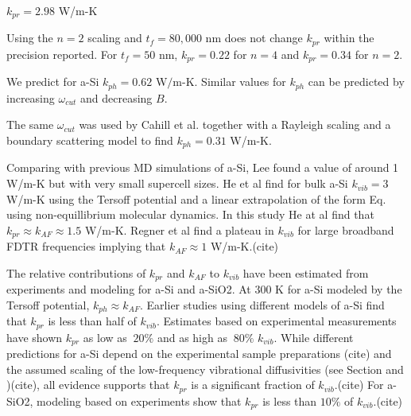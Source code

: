 \documentclass[aps,prb,twocolumn,superscriptaddress,footinbib,amsmath,amssymb,floatfix]{revtex4}
\begin{document}
$k_{pr} = 2.98$ W/m-K

Using the $n=2$ scaling and $t_f = 80,000$ nm does not change 
$k_{pr}$ within the precision reported. For $t_f = 50$ nm, 
$k_{pr} = 0.22$ for $n=4$ and $k_{pr} = 0.34$ for $n=2$. 






We predict for a-Si $k_{ph} = 0.62$ 
W$/$m-K. Similar values for $k_{ph}$ can be predicted by increasing 
$\omega_{cut}$ and decreasing $B$. 

The same $\omega_{cut}$ was used by Cahill et al. 
together with a Rayleigh scaling and a boundary scattering model to 
find $k_{ph} = 0.31$ W/m-K.\cite{cahill_thermal_1994} 

Comparing with previous MD simulations of a-Si, 
Lee found a value of around 1 W/m-K 
but with very small supercell sizes.\cite{lee_molecular-dynamics_1991}
He et al find for bulk a-Si $k_{vib} = 3$ W/m-K using the Tersoff 
potential and a linear extrapolation of the form Eq. using 
non-equillibrium molecular dynamics. In this study He at al find 
that $k_{pr} \approx k_{AF} \approx 1.5$ W/m-K.  Regner et al find 
a plateau in $k_{vib}$ for large broadband FDTR frequencies 
implying that $k_{AF} \approx 1$ W/m-K.(cite) 

The relative contributions of $k_{pr}$ and $k_{AF}$ to $k_{vib}$ have 
been estimated from experiments and modeling for 
a-Si and a-SiO2. At 300 K for a-Si modeled by the Tersoff potential,   
$k_{ph} \approx k_{AF}$.\cite{he_heat_2011} Earlier studies using 
different models of a-Si find 
that $k_{pr}$ is less than half of 
$k_{vib}$.\cite{feldman_thermal_1993,
feldman_numerical_1999} Estimates based on experimental measurements 
have shown $k_{pr}$ as low as 
$~20\%$\cite{cahill_thermal_1994,feldman_numerical_1999} 
and as high as $~80\%$ $k_{vib}$.
\cite{liu_high_2009,yang_anomalously_2010}
While different predictions for a-Si 
depend on the experimental sample preparations
(cite) 
and the assumed scaling of the low-frequency 
vibrational diffusivities (see Section and )(cite), 
all evidence supports that $k_{pr}$ is a significant fraction 
of $k_{vib}$.(cite) 
For a-SiO2, 
modeling based on experiments show that $k_{pr}$ is less than $10\%$ 
of $k_{vib}$.(cite) 
\end{document}

